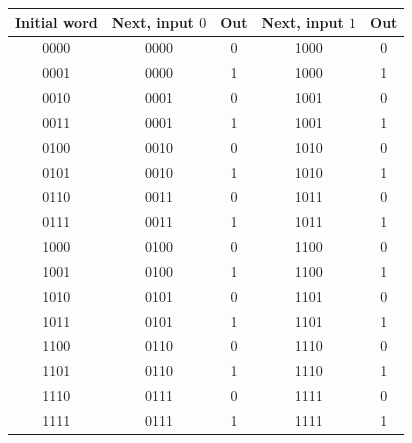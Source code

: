 \begin{tabular}{ccccc}
\toprule
Initial word & Next, input $0$ & Out & Next, input $1$ & Out\\
\midrule
0000 & 0000 & 0 & 1000 & 0 \\
0001 & 0000 & 1 & 1000 & 1 \\
0010 & 0001 & 0 & 1001 & 0 \\
0011 & 0001 & 1 & 1001 & 1 \\
0100 & 0010 & 0 & 1010 & 0 \\
0101 & 0010 & 1 & 1010 & 1 \\
0110 & 0011 & 0 & 1011 & 0 \\
0111 & 0011 & 1 & 1011 & 1 \\
1000 & 0100 & 0 & 1100 & 0 \\
1001 & 0100 & 1 & 1100 & 1 \\
1010 & 0101 & 0 & 1101 & 0 \\
1011 & 0101 & 1 & 1101 & 1 \\
1100 & 0110 & 0 & 1110 & 0 \\
1101 & 0110 & 1 & 1110 & 1 \\
1110 & 0111 & 0 & 1111 & 0 \\
1111 & 0111 & 1 & 1111 & 1 \\
\bottomrule
\end{tabular}
